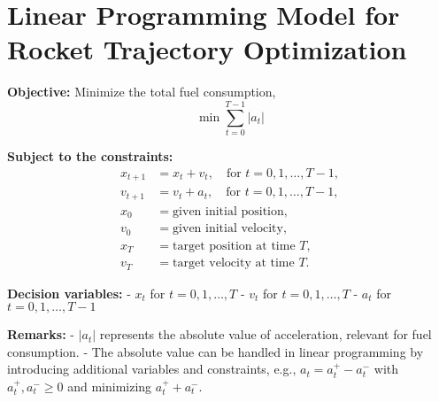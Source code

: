 \documentclass{article}
\begin{document}
\section*{Linear Programming Model for Rocket Trajectory Optimization}

\textbf{Objective:} Minimize the total fuel consumption,
\[
\min \sum_{t=0}^{T-1} |a_t|
\]

\textbf{Subject to the constraints:}
\begin{align*}
x_{t+1} &= x_t + v_t, \quad \text{for } t = 0, 1, \ldots, T-1, \\
v_{t+1} &= v_t + a_t, \quad \text{for } t = 0, 1, \ldots, T-1, \\
x_0 &= \text{given initial position}, \\
v_0 &= \text{given initial velocity}, \\
x_T &= \text{target position at time } T, \\
v_T &= \text{target velocity at time } T.
\end{align*}

\textbf{Decision variables:}
- \( x_t \) for \( t = 0, 1, \ldots, T \)
- \( v_t \) for \( t = 0, 1, \ldots, T \)
- \( a_t \) for \( t = 0, 1, \ldots, T-1 \)

\textbf{Remarks:}
- \( |a_t| \) represents the absolute value of acceleration, relevant for fuel consumption.
- The absolute value can be handled in linear programming by introducing additional variables and constraints, e.g., \( a_t = a_t^+ - a_t^- \) with \( a_t^+, a_t^- \geq 0 \) and minimizing \( a_t^+ + a_t^- \).
\end{document}
